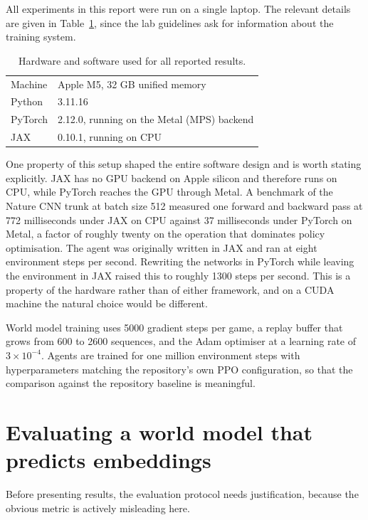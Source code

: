 \documentclass[11pt,a4paper]{article}
\begin{document}
All experiments in this report were run on a single laptop. The relevant details
are given in Table~\ref{tab:system}, since the lab guidelines ask for information
about the training system.

\begin{table}[h]
\centering
\caption{Hardware and software used for all reported results.}
\label{tab:system}
\begin{tabular}{ll}
\toprule
Machine & Apple M5, 32 GB unified memory \\
Python & 3.11.16 \\
PyTorch & 2.12.0, running on the Metal (MPS) backend \\
JAX & 0.10.1, running on CPU \\
\bottomrule
\end{tabular}
\end{table}

One property of this setup shaped the entire software design and is worth stating
explicitly. JAX has no GPU backend on Apple silicon and therefore runs on CPU,
while PyTorch reaches the GPU through Metal. A benchmark of the Nature CNN trunk at
batch size 512 measured one forward and backward pass at 772 milliseconds under
JAX on CPU against 37 milliseconds under PyTorch on Metal, a factor of roughly
twenty on the operation that dominates policy optimisation. The agent was
originally written in JAX and ran at eight environment steps per second. Rewriting
the networks in PyTorch while leaving the environment in JAX raised this to
roughly 1300 steps per second. This is a property of the hardware rather than of
either framework, and on a CUDA machine the natural choice would be different.

World model training uses 5000 gradient steps per game, a replay buffer that grows
from 600 to 2600 sequences, and the Adam optimiser at a learning rate of
$3 \times 10^{-4}$. Agents are trained for one million environment steps with
hyperparameters matching the repository's own PPO configuration, so that the
comparison against the repository baseline is meaningful.

\section{Evaluating a world model that predicts embeddings}
\label{sec:eval}

Before presenting results, the evaluation protocol needs justification, because the
obvious metric is actively misleading here.
\end{document}
